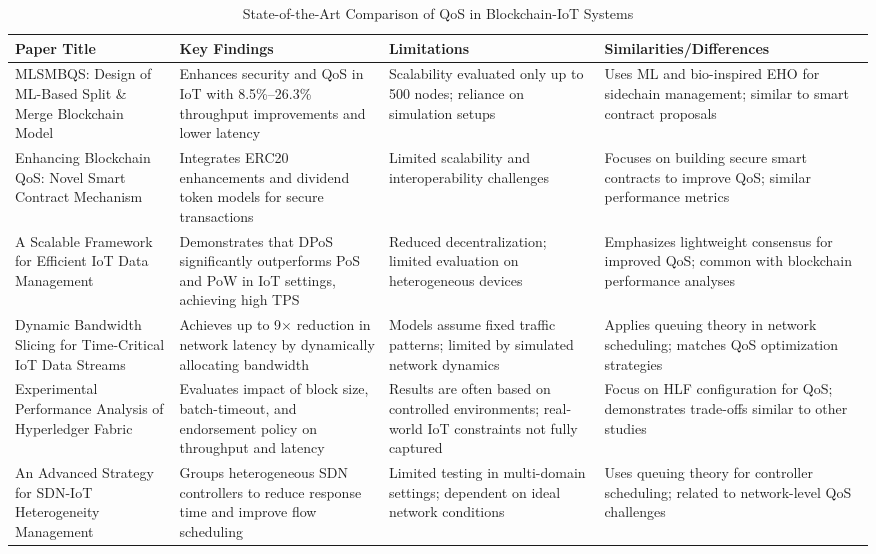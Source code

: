 \documentclass[12pt,onecolumn]{IEEEtran} %
\begin{document}
\begin{table}[h]
\centering
\caption{State-of-the-Art Comparison of QoS in Blockchain-IoT Systems}
\begin{tabular}{>{\raggedright\arraybackslash}p{3cm}>{\raggedright\arraybackslash}p{3.5cm}>{\raggedright\arraybackslash}p{3cm}>{\raggedright\arraybackslash}p{3cm}}
\toprule
\textbf{Paper Title} & \textbf{Key Findings} & \textbf{Limitations} & \textbf{Similarities/Differences} \\
\midrule
MLSMBQS: Design of ML-Based Split \& Merge Blockchain Model & Enhances security and QoS in IoT with 8.5\%--26.3\% throughput improvements and lower latency & Scalability evaluated only up to 500 nodes; reliance on simulation setups & Uses ML and bio-inspired EHO for sidechain management; similar to smart contract proposals \\
\midrule
Enhancing Blockchain QoS: Novel Smart Contract Mechanism & Integrates ERC20 enhancements and dividend token models for secure transactions & Limited scalability and interoperability challenges & Focuses on building secure smart contracts to improve QoS; similar performance metrics \\
\midrule
A Scalable Framework for Efficient IoT Data Management & Demonstrates that DPoS significantly outperforms PoS and PoW in IoT settings, achieving high TPS & Reduced decentralization; limited evaluation on heterogeneous devices & Emphasizes lightweight consensus for improved QoS; common with blockchain performance analyses \\
\midrule
Dynamic Bandwidth Slicing for Time-Critical IoT Data Streams & Achieves up to 9$\times$ reduction in network latency by dynamically allocating bandwidth & Models assume fixed traffic patterns; limited by simulated network dynamics & Applies queuing theory in network scheduling; matches QoS optimization strategies \\
\midrule
Experimental Performance Analysis of Hyperledger Fabric & Evaluates impact of block size, batch-timeout, and endorsement policy on throughput and latency & Results are often based on controlled environments; real-world IoT constraints not fully captured & Focus on HLF configuration for QoS; demonstrates trade-offs similar to other studies \\
\midrule
An Advanced Strategy for SDN-IoT Heterogeneity Management & Groups heterogeneous SDN controllers to reduce response time and improve flow scheduling & Limited testing in multi-domain settings; dependent on ideal network conditions & Uses queuing theory for controller scheduling; related to network-level QoS challenges \\
\bottomrule
\end{tabular}
\end{table}
\end{document}
